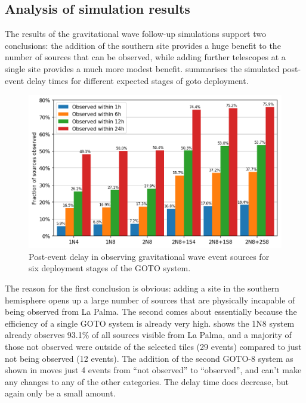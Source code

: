 \begin{colsection}
\begin{colsection}
\end{colsection}


\subsection{Analysis of simulation results}
\label{sec:gw_sim_analysis}
\begin{colsection}

The results of the gravitational wave follow-up simulations support two conclusions: the addition of the southern site provides a huge benefit to the number of sources that can be observed, while adding further telescopes at a single site provides a much more modest benefit.  summarises the simulated post-event delay times for different expected stages of \gls{goto} deployment.

\begin{figure}[t]
    \begin{center}
        \includegraphics[width=\linewidth]{images/gw_sims/results.png}
    \end{center}
    \caption[Simulation delay time for different GOTO systems]{
        Post-event delay in observing gravitational wave event sources for six deployment stages of the GOTO system.
    }\label{fig:sim_results}
\end{figure}

The reason for the first conclusion is obvious: adding a site in the southern hemisphere opens up a large number of sources that are physically incapable of being observed from La Palma. The second comes about essentially because the efficiency of a single GOTO system is already very high.  shows the 1N8 system already observes 93.1\% of all sources visible from La Palma, and a majority of those not observed were outside of the selected tiles (29 events) compared to just not being observed (12 events). The addition of the second GOTO-8 system as shown in  moves just 4 events from ``not observed'' to ``observed'', and can't make any changes to any of the other categories. The delay time does decrease, but again only be a small amount.


\end{colsection}
\end{colsection}
